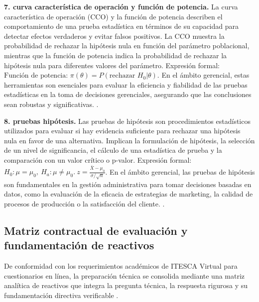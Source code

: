 {\textbf{7. curva característica de operación y función de potencia.} La curva característica de operación (CCO) y la función de potencia describen el comportamiento de una prueba estadística en términos de su capacidad para detectar efectos verdaderos y evitar falsos positivos. La CCO muestra la probabilidad de rechazar la hipótesis nula en función del parámetro poblacional, mientras que la función de potencia indica la probabilidad de rechazar la hipótesis nula para diferentes valores del parámetro. Expresión formal: $\text{Función de potencia: } \pi(\theta) = P(\text{rechazar } H_0 | \theta)$. En el ámbito gerencial, estas herramientas son esenciales para evaluar la eficiencia y fiabilidad de las pruebas estadísticas en la toma de decisiones gerenciales, asegurando que las conclusiones sean robustas y significativas. \citep{anderson2012,lind2012,wackerly2010}.

\textbf{8. pruebas hipótesis.} Las pruebas de hipótesis son procedimientos estadísticos utilizados para evaluar si hay evidencia suficiente para rechazar una hipótesis nula en favor de una alternativa. Implican la formulación de hipótesis, la selección de un nivel de significancia, el cálculo de una estadística de prueba y la comparación con un valor crítico o p-valor. Expresión formal: $H_0: \mu = \mu_0, \ H_a: \mu \neq \mu_0. \ z = \frac{\bar{X} - \mu_0}{\sigma/\sqrt{n}}$. En el ámbito gerencial, las pruebas de hipótesis son fundamentales en la gestión administrativa para tomar decisiones basadas en datos, como la evaluación de la eficacia de estrategias de marketing, la calidad de procesos de producción o la satisfacción del cliente. \citep{anderson2012,lind2012,wackerly2010}.


\subsection{Matriz contractual de evaluación y fundamentación de reactivos}
De conformidad con los requerimientos académicos de ITESCA Virtual para cuestionarios en línea, la preparación técnica se consolida mediante una matriz analítica de reactivos que integra la pregunta técnica, la respuesta rigurosa y su fundamentación directiva verificable \citep{anderson2012,wackerly2010,lind2012}.

}
